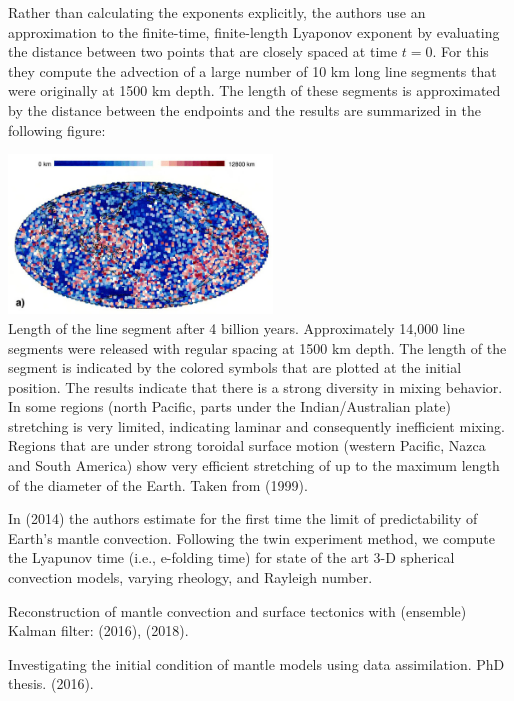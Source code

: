 Rather than calculating the exponents explicitly, the authors 
use an approximation to the finite-time,
finite-length Lyaponov exponent by evaluating the distance between two points that are closely spaced
at time $t=0$. For this they compute the advection of a
large number of 10 km long line segments that were
originally at 1500 km depth. The length of these segments is approximated by the distance between the
endpoints and the results are summarized in the following figure:

\begin{center}
\includegraphics[width=7cm]{images/mixing/vazh99b}\\
{\captionfont Length
of the line segment after 4 billion years. Approximately 14,000 line segments were released with 
regular spacing at 1500 km depth. The length of the segment is indicated by the colored symbols 
that are plotted at the initial position. The results indicate that there is a strong
diversity in mixing behavior. In some regions (north Pacific, parts under the Indian/Australian plate) 
stretching is very limited, indicating laminar and consequently inefficient mixing. Regions that 
are under strong toroidal surface motion (western Pacific, Nazca and South
America) show very efficient stretching of up to the maximum length of the diameter of the Earth. 
Taken from \textcite{vazh99} (1999).}
\end{center}


In \textcite{becr14} (2014) the authors estimate for the ﬁrst time the limit of predictability of Earth’s
mantle convection. Following the twin experiment method, we compute the Lyapunov time (i.e., e-folding
time) for state of the art 3-D spherical convection models, varying rheology, and Rayleigh number.


Reconstruction of mantle convection and surface tectonics with (ensemble) Kalman filter:
\textcite{bocf16} (2016),
\textcite{bofc18} (2018).

Investigating the initial condition
of mantle models using data assimilation. PhD thesis. \textcite{pric16} (2016).


